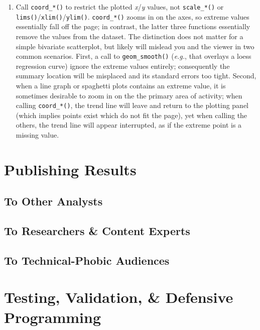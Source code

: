 \documentclass[
]{book}
\providecommand{\tightlist}{%
  \setlength{\itemsep}{0pt}\setlength{\parskip}{0pt}}
\begin{document}
\begin{enumerate}
\def\labelenumi{\arabic{enumi}.}
\tightlist
\item
  Call \texttt{coord\_*()} to restrict the plotted \emph{x}/\emph{y} values, not \texttt{scale\_*()} or \texttt{lims()}/\texttt{xlim()}/\texttt{ylim()}. \texttt{coord\_*()} zooms in on the axes, so extreme values essentially fall off the page; in contrast, the latter three functions essentially remove the values from the dataset. The distinction does not matter for a simple bivariate scatterplot, but likely will mislead you and the viewer in two common scenarios. First, a call to \texttt{geom\_smooth()} (\emph{e.g.}, that overlays a loess regression curve) ignore the extreme values entirely; consequently the summary location will be misplaced and its standard errors too tight. Second, when a line graph or spaghetti plots contains an extreme value, it is sometimes desirable to zoom in on the the primary area of activity; when calling \texttt{coord\_*()}, the trend line will leave and return to the plotting panel (which implies points exist which do not fit the page), yet when calling the others, the trend line will appear interrupted, as if the extreme point is a missing value.
\end{enumerate}

\hypertarget{publication}{%
\chapter{Publishing Results}\label{publication}}

\hypertarget{to-other-analysts}{%
\section{To Other Analysts}\label{to-other-analysts}}

\hypertarget{to-researchers-content-experts}{%
\section{To Researchers \& Content Experts}\label{to-researchers-content-experts}}

\hypertarget{to-technical-phobic-audiences}{%
\section{To Technical-Phobic Audiences}\label{to-technical-phobic-audiences}}

\hypertarget{testing-and-validation}{%
\chapter{Testing, Validation, \& Defensive Programming}\label{testing-and-validation}}
\end{document}
